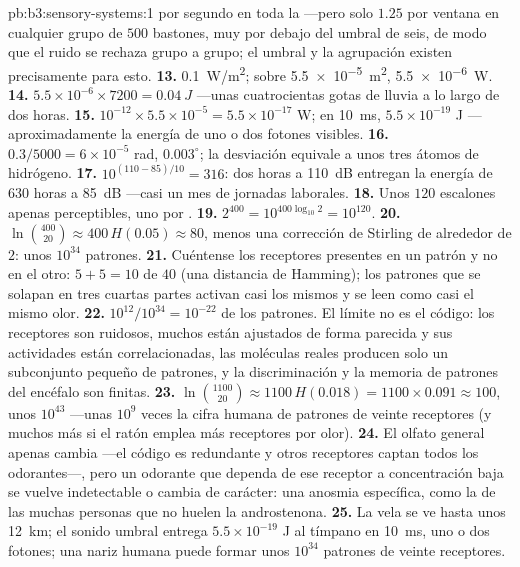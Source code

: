 \begin{solution}{pb:b3:sensory-systems:1}
por segundo en toda la  ---pero solo $1.25$ por ventana en
cualquier grupo de $500$ bastones, muy por debajo del umbral de seis,
de modo que el ruido se rechaza grupo a grupo; el umbral y la
agrupación existen precisamente para esto.
\textbf{13.} \qty{0.1}{W/m^2}; sobre \qty{5.5e-5}{m^2}, \qty{5.5e-6}{W}.
\textbf{14.} $5.5\times 10^{-6}\times 7200 = \qty{0.04}{J}$ ---unas
cuatrocientas gotas de lluvia a lo largo de dos horas.
\textbf{15.} $10^{-12}\times 5.5\times 10^{-5} = 5.5\times 10^{-17}$ W;
en \qty{10}{ms}, $5.5\times 10^{-19}$ J ---aproximadamente la energía de
uno o dos fotones visibles.
\textbf{16.} $0.3/5000 = 6\times 10^{-5}$ rad, $0.003^{\circ}$; la
desviación equivale a unos tres átomos de hidrógeno.
\textbf{17.} $10^{(110 - 85)/10} = 316$: dos horas a \qty{110}{dB}
entregan la energía de $630$ horas a \qty{85}{dB} ---casi un mes de
jornadas laborales.
\textbf{18.} Unos $120$ escalones apenas perceptibles, uno por .
\textbf{19.} $2^{400} = 10^{400\log_{10}2} = 10^{120}$.
\textbf{20.} $\ln\binom{400}{20} \approx 400\,H(0.05) \approx 80$, menos
una corrección de Stirling de alrededor de $2$: unos $10^{34}$ patrones.
\textbf{21.} Cuéntense los receptores presentes en un patrón y no en el
otro: $5 +
5 = 10$ de $40$ (una distancia de Hamming); los patrones que se solapan
en tres cuartas partes activan casi los mismos  y se leen
como casi el mismo olor.
\textbf{22.} $10^{12}/10^{34} = 10^{-22}$ de los patrones. El límite no
es el código: los receptores son ruidosos, muchos están ajustados de
forma parecida y sus actividades están correlacionadas, las moléculas
reales producen solo un subconjunto pequeño de patrones, y la
discriminación y la memoria de patrones del encéfalo son finitas.
\textbf{23.} $\ln\binom{1100}{20} \approx 1100\,H(0.018) = 1100\times
0.091 \approx 100$, unos $10^{43}$ ---unas $10^{9}$ veces la cifra
humana de patrones de veinte receptores (y muchos más si el ratón
emplea más receptores por olor).
\textbf{24.} El olfato general apenas cambia ---el código es redundante
y otros receptores captan todos los odorantes---, pero un odorante que
dependa de ese receptor a concentración baja se vuelve indetectable o
cambia de carácter: una anosmia específica, como la de las muchas
personas que no huelen la androstenona.
\textbf{25.} La vela se ve hasta unos \qty{12}{km}; el sonido umbral
entrega $5.5\times 10^{-19}$ J al tímpano en \qty{10}{ms}, uno o dos
fotones; una nariz humana puede formar unos $10^{34}$ patrones de
veinte receptores.
\end{solution}
